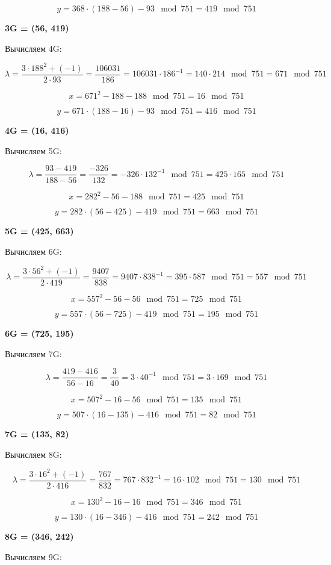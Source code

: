 \[
y = 368 \cdot (188 - 56) - 93\mod{751} = 419\mod{751}
\]

\textbf{3G = (56, 419)}

Вычисляем 4G:

\[
\lambda = \frac{ 3 \cdot 188^2 + (-1) }{2 \cdot 93} = \frac{106031}{186} = 106031 \cdot 186^{-1} = 140 \cdot 214\mod{751} = 671\mod{751}
\]


\[
x = 671^2 - 188 - 188 \mod{751} = 16\mod{751}
\]


\[
y = 671 \cdot (188 - 16) - 93\mod{751} = 416\mod{751}
\]

\textbf{4G = (16, 416)}

Вычисляем 5G:

\[
\lambda = \frac{93-419}{188-56} = \frac{-326}{132} = -326 \cdot 132^{-1}\mod{751} = 425 \cdot 165\mod{751}
\]


\[
x = 282^2 - 56 - 188 \mod{751} = 425\mod{751}
\]


\[
y = 282 \cdot (56 - 425) - 419\mod{751} = 663\mod{751}
\]

\textbf{5G = (425, 663)}

Вычисляем 6G:

\[
\lambda = \frac{ 3 \cdot 56^2 + (-1) }{2 \cdot 419} = \frac{9407}{838} = 9407 \cdot 838^{-1} = 395 \cdot 587\mod{751} = 557\mod{751}
\]


\[
x = 557^2 - 56 - 56 \mod{751} = 725\mod{751}
\]


\[
y = 557 \cdot (56 - 725) - 419\mod{751} = 195\mod{751}
\]

\textbf{6G = (725, 195)}

Вычисляем 7G:

\[
\lambda = \frac{419-416}{56-16} = \frac{3}{40} = 3 \cdot 40^{-1}\mod{751} = 3 \cdot 169\mod{751}
\]


\[
x = 507^2 - 16 - 56 \mod{751} = 135\mod{751}
\]


\[
y = 507 \cdot (16 - 135) - 416\mod{751} = 82\mod{751}
\]

\textbf{7G = (135, 82)}

Вычисляем 8G:

\[
\lambda = \frac{ 3 \cdot 16^2 + (-1) }{2 \cdot 416} = \frac{767}{832} = 767 \cdot 832^{-1} = 16 \cdot 102\mod{751} = 130\mod{751}
\]


\[
x = 130^2 - 16 - 16 \mod{751} = 346\mod{751}
\]


\[
y = 130 \cdot (16 - 346) - 416\mod{751} = 242\mod{751}
\]

\textbf{8G = (346, 242)}

Вычисляем 9G:

